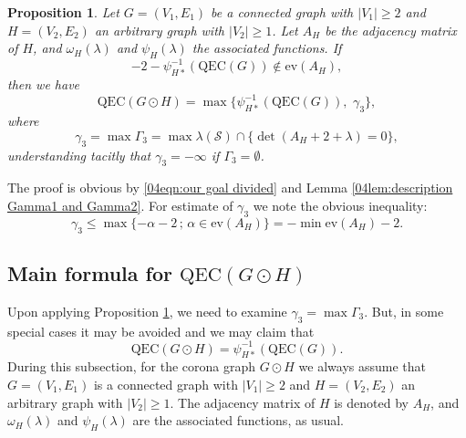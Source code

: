 \documentclass[12pt,a4paper]{article}
\newtheorem{proposition}[theorem]{Proposition}
\newcommand{\1}{{\bm 1}}
\numberwithin{equation}{section}
\begin{document}
\begin{proposition}\label{04prop:preliminary formula with gamma3}
Let $G=(V_1,E_1)$ be a connected graph with $|V_1|\ge2$
and $H=(V_2,E_2)$ an arbitrary graph with $|V_2|\ge1$.
Let $A_H$ be the adjacency matrix of $H$,
and $\omega_H(\lambda)$ and $\psi_{H}(\lambda)$
the associated functions.
If 
%
\begin{equation}\label{03eqn:condition by not in ev(AH)}
-2-\psi_{H*}^{-1}(\mathrm{QEC}(G)) \not\in\mathrm{ev}(A_H),
\end{equation}
then we have
%
\begin{equation}\label{04eqn:preliminary formula for corona graph (0)}
\mathrm{QEC}(G\odot H)
=\max \{\psi_{H*}^{-1}(\mathrm{QEC}(G)),\,\,\gamma_3\},
\end{equation}
where 
%
\begin{equation}\label{04eqn:def of gamma3}
\gamma_3=\max \Gamma_3
=\max\lambda(\mathcal{S})\cap\{\det(A_H+2+\lambda)=0\},
\end{equation}
understanding tacitly that
$\gamma_3=-\infty$ if $\Gamma_3=\emptyset$.
\end{proposition}

The proof is obvious by
\eqref{04eqn:our goal divided} and
Lemma \ref{04lem:description Gamma1 and Gamma2}.
For estimate of $\gamma_3$ we note the obvious inequality:
%
\begin{equation}\label{04eqn:max Gamma3}
\gamma_3
\le \max\{-\alpha-2\,;\,\alpha\in\mathrm{ev}(A_H)\}
=-\min \mathrm{ev}(A_H)-2.
\end{equation}
%



\subsection{Main formula for $\mathrm{QEC}(G\odot H)$}
\label{04subsec:Formula for QEC of corona graph}

Upon applying Proposition
\ref{04prop:preliminary formula with gamma3},
we need to examine $\gamma_3=\max\Gamma_3$.
But, in some special cases it may be avoided
and we may claim that
%
\begin{equation}\label{04eqn:preliminary formula for corona graph (00)}
\mathrm{QEC}(G\odot H)
=\psi_{H*}^{-1}(\mathrm{QEC}(G)).
\end{equation}
%
During this subsection, for the corona graph $G\odot H$
we always assume that 
$G=(V_1,E_1)$ is a connected graph with $|V_1|\ge2$
and $H=(V_2,E_2)$ an arbitrary graph with $|V_2|\ge1$.
The adjacency matrix of $H$ is denoted by $A_H$,
and $\omega_H(\lambda)$ and $\psi_{H}(\lambda)$ are
the associated functions, as usual.
\end{document}
